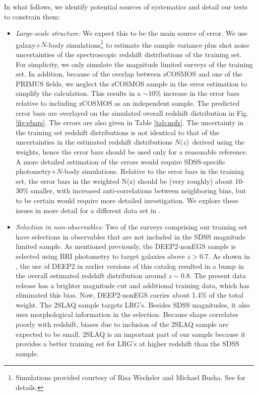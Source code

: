 \documentclass[preprint]{aastex}
\newcommand{\nofz}{$N(z$)}
\begin{document}
In what follows, we identify potential sources of systematics and detail our
tests to constrain them:

\begin{itemize}

\item {\it Large-scale structure: } We expect this to be the main source of
error.  We use galaxy+$N$-body simulations\footnote{Simulations provided courtesy of Risa Wechsler and
Michael Busha. See \cite{bushasimulations} for details.}
 to estimate the sample variance plus shot
noise uncertainties of the spectroscopic redshift distributions of the training
set.  For simplicity, we only simulate the magnitude limited surveys of the
training set.  In addition, because of the overlap between zCOSMOS and one of
the PRIMUS fields, we neglect the zCOSMOS sample in the error estimation to
simplify the calculation.  This results in a $\sim$10\% increase in the error
bars relative to including zCOSMOS as an independent sample.  The predicted
error bars are overlayed on the simulated overall redshift
distribution in Fig.
\ref{fig:ebars}.  The errors are also given in Table \ref{tab:nofz}. The
uncertainty in the training set redshift distributions is not identical to that
of the uncertainties in the estimated redshift distributions \nofz\ derived using
the weights, hence the error bars should be used only for a reasonable
reference.  A more detailed estimation of the errors would require SDSS-specific
photometry+$N$-body simulations.  Relative to the error bars in the
training set, the error bars in the weighted N(z) should be (very roughly)
about 10-30\% smaller, with increased anti-correlations between neighboring
bins, but to be certain would require more detailed investigation.
We explore these issues in more detail for a different data set
in \citet{CunhaPhotozLSS11}.


\item {\it Selection in non-observables: } Two of the surveys comprising our
training set have selections in observables that are not included in the SDSS
magnitude limited sample.  As mentioned previously, the DEEP2-nonEGS sample is
selected using BRI photometry to target galaxies above $z>0.7$.  As shown in
\citet{CunhaPhotoz09}, the use of DEEP2 in earlier versions of this catalog
resulted in a bump in the overall estimated redshift distribution around $z\sim
0.8$.  The present data release has a brighter magnitude cut and additional
training data, which has eliminated this bias.  
Now, DEEP2-nonEGS carries about 1.4\% of the total weight.  The 2SLAQ sample targets
LRG's.  Besides SDSS magnitudes, it also uses morphological information in the
selection.  Because shape correlates poorly with redshift, biases due to inclusion of the
2SLAQ sample are expected to be small.  2SLAQ is an important part of our
sample because it provides a better training set for LRG's at higher redshift
than the SDSS sample.


\end{itemize}
\end{document}
